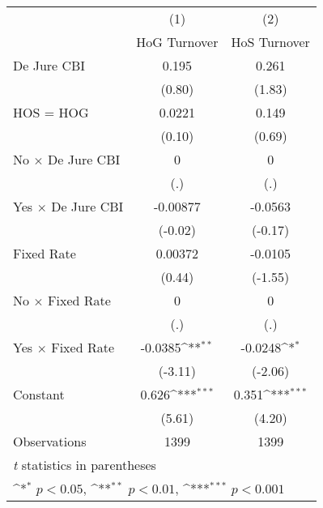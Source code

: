 \begin{table}[htbp]\centering
\def\sym#1{\ifmmode^{#1}\else\(^{#1}\)\fi}
\caption{\label{hoshogmultIndFEDJ}}
\begin{tabular}{l*{2}{c}}
\toprule
                                        &\multicolumn{1}{c}{(1)}&\multicolumn{1}{c}{(2)}\\
                                        &\multicolumn{1}{c}{HoG Turnover}&\multicolumn{1}{c}{HoS Turnover}\\
\midrule
De Jure CBI                             &    0.195         &    0.261         \\
                                        &   (0.80)         &   (1.83)         \\
\addlinespace
HOS = HOG                               &   0.0221         &    0.149         \\
                                        &   (0.10)         &   (0.69)         \\
\addlinespace
No $\times$ De Jure CBI                 &        0         &        0         \\
                                        &      (.)         &      (.)         \\
\addlinespace
Yes $\times$ De Jure CBI                & -0.00877         &  -0.0563         \\
                                        &  (-0.02)         &  (-0.17)         \\
\addlinespace
Fixed Rate                              &  0.00372         &  -0.0105         \\
                                        &   (0.44)         &  (-1.55)         \\
\addlinespace
No $\times$ Fixed Rate                  &        0         &        0         \\
                                        &      (.)         &      (.)         \\
\addlinespace
Yes $\times$ Fixed Rate                 &  -0.0385\sym{**} &  -0.0248\sym{*}  \\
                                        &  (-3.11)         &  (-2.06)         \\
\addlinespace
Constant                                &    0.626\sym{***}&    0.351\sym{***}\\
                                        &   (5.61)         &   (4.20)         \\
\midrule
Observations                            &     1399         &     1399         \\
\bottomrule
\multicolumn{3}{l}{\footnotesize \textit{t} statistics in parentheses}\\
\multicolumn{3}{l}{\footnotesize \sym{*} \(p<0.05\), \sym{**} \(p<0.01\), \sym{***} \(p<0.001\)}\\
\end{tabular}
\end{table}
